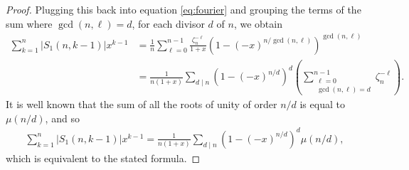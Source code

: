 \documentclass[10pt,a4paper]{amsart}
\newcommand{\card}[1]{\left|#1\right|}
\newcommand{\nroot}{\zeta_n} %
\begin{document}
\begin{proof}
    Plugging this back into  equation \eqref{eq:fourier} and grouping the terms
    of the sum where $\gcd(n,\ell)=d$, for each divisor $d$ of $n$, we obtain
    \begin{align*}
        \sum_{k=1}^n\card{S_1(n,k-1)}x^{k-1} 
        & =\frac{1}{n} \sum_{\ell=0}^{n-1} \frac{\nroot^{-\ell}}{1 + x} \left(1 - (-x)^{n / \gcd(n,\ell)}\right)^{\gcd(n,\ell)}\\
        &=         \frac{1}{n(1 + x)} \sum_{d \mid n} \left(1 - (-x)^{n / d}\right)^d \left(\sum_{\substack{\ell=0\\ \gcd(n, \ell) = d}}^{n-1} \nroot^{-\ell} \right).
    \end{align*}
    It is well known that the sum of all the roots of unity of order $n / d$ is equal to $\mu(n/d)$, and so
    \begin{align*}
       \sum_{k=1}^n\card{S_1(n,k-1)}x^{k-1}
        = \frac{1}{n(1 + x)} \sum_{d \mid n} \left(1 - (-x)^{n / d}\right)^d \mu(n/d),
    \end{align*}
    which is equivalent to the stated formula.
\end{proof}
\end{document}
